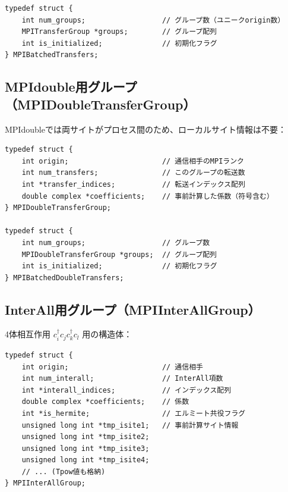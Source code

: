 \documentclass[11pt,a4paper]{article}
\begin{document}
\begin{lstlisting}[caption=MPIBatchedTransfers構造体]
typedef struct {
    int num_groups;                  // グループ数（ユニークorigin数）
    MPITransferGroup *groups;        // グループ配列
    int is_initialized;              // 初期化フラグ
} MPIBatchedTransfers;
\end{lstlisting}

\subsection{MPIdouble用グループ（MPIDoubleTransferGroup）}

MPIdoubleでは両サイトがプロセス間のため、ローカルサイト情報は不要：

\begin{lstlisting}[caption=MPIDoubleTransferGroup構造体]
typedef struct {
    int origin;                      // 通信相手のMPIランク
    int num_transfers;               // このグループの転送数
    int *transfer_indices;           // 転送インデックス配列
    double complex *coefficients;    // 事前計算した係数（符号含む）
} MPIDoubleTransferGroup;

typedef struct {
    int num_groups;                  // グループ数
    MPIDoubleTransferGroup *groups;  // グループ配列
    int is_initialized;              // 初期化フラグ
} MPIBatchedDoubleTransfers;
\end{lstlisting}

\subsection{InterAll用グループ（MPIInterAllGroup）}

4体相互作用 $c^\dagger_i c_j c^\dagger_k c_l$ 用の構造体：

\begin{lstlisting}[caption=MPIInterAllGroup構造体]
typedef struct {
    int origin;                      // 通信相手
    int num_interall;                // InterAll項数
    int *interall_indices;           // インデックス配列
    double complex *coefficients;    // 係数
    int *is_hermite;                 // エルミート共役フラグ
    unsigned long int *tmp_isite1;   // 事前計算サイト情報
    unsigned long int *tmp_isite2;
    unsigned long int *tmp_isite3;
    unsigned long int *tmp_isite4;
    // ... (Tpow値も格納)
} MPIInterAllGroup;
\end{lstlisting}

\end{document}
